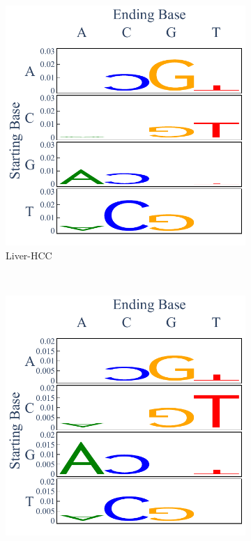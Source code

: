 \begin{figure}[ht!]
    \begin{subfigure}{.5\textwidth}
    \includegraphics[scale=0.7]{graphics/spectra_Liver-HCC.pdf}
    \caption{Liver-HCC}
    \label{fig:spectra_liver}
    \end{subfigure}
    ~
    \begin{subfigure}{.5\textwidth}
    \includegraphics[scale=0.7]{graphics/spectra_Panc-AdenoCA.pdf}

\end{subfigure}
\end{figure}
